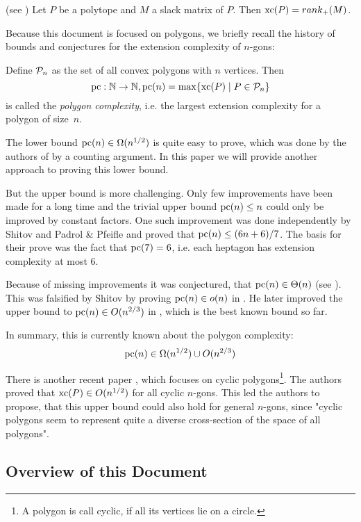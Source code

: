 \begin{theorem}(see \cite{yannakakis1991expressing})
  Let $P$ be a polytope and $M$ a slack matrix of $P$. Then $\xc(P) = rank_+(M)$.
\end{theorem}

Because this document is focused on polygons, we briefly recall the history of bounds and conjectures for the extension complexity of $n$-gons:

Define $\P_n$ as the set of all convex polygons with $n$ vertices. Then $$\pc:\N \to \N, \pc(n) = \max \{\xc(P) \mid P \in \P_n\}$$ is called the \textit{polygon complexity}, i.e. the largest extension complexity for a polygon of size~$n$.

The lower bound $\pc(n) \in \Omega(n^{1/2})$ is quite easy to prove, which was done by the authors of \cite{fiorini2012extended} by a counting argument. In this paper we will provide another approach to proving this lower bound. 

But the upper bound is more challenging. Only few improvements have been made for a long time and the trivial upper bound $\pc(n) \leq n$ could only be improved by constant factors. One such improvement was done independently by Shitov \cite{shitov2014upper} and Padrol \& Pfeifle \cite{padrol2014polygons} and proved that $\pc(n) \leq (6n+6)/7$. The basis for their prove was the fact that $\pc(7)=6$, i.e. each heptagon has extension complexity at most 6.

Because of missing improvements it was conjectured, that $\pc(n) \in \Theta(n)$ (see \cite{fiorini2012extended}). This was falsified by Shitov by proving $\pc(n) \in o(n)$ in \cite{shitov2014sublinear}. He later improved the upper bound to $\pc(n) \in O(n^{2/3})$ in \cite{shitov2020sublinear}, which is the best known bound so far.

In summary, this is currently known about the polygon complexity:
$$\pc(n) \in \Omega(n^{1/2}) \cup O(n^{2/3})$$

There is another recent paper \cite{kwan2020extension}, which focuses on cyclic polygons\footnote{A polygon is call cyclic, if all its vertices lie on a circle.}. The authors proved that $\xc(P) \in O(n^{1/2})$ for all cyclic $n$-gons. 
This led the authors to propose, that this upper bound could also hold for general $n$-gons, since "cyclic polygons seem to represent quite a diverse cross-section of the space of all polygons".



\subsection{Overview of this Document}

